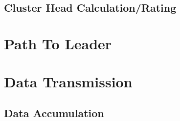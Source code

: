 \documentclass[USenglish]{uit-thesis}
\begin{document}



\subsection{Cluster Head Calculation/Rating}

\section{Path To Leader}
\section{Data Transmission}

\subsection{Data Accumulation}
\end{document}
